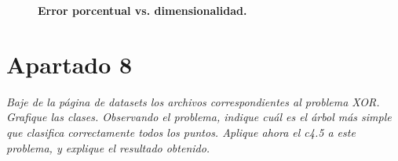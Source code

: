 \documentclass[a4paper, 11pt]{article} %
\begin{document}
\begin{figure}[H]
\captionsetup[subfigure]{labelformat=empty}
  \centering
  \caption*{\textbf{Error porcentual vs. dimensionalidad.}}
\end{figure}


\section*{Apartado 8} 
\textit{Baje de la página de datasets los archivos correspondientes al problema
XOR. Grafique las clases. Observando el problema, indique cuál es el árbol más
simple que clasifica correctamente todos los puntos. Aplique ahora el c4.5 a
este problema, y explique el resultado obtenido.}\\
\end{document}
